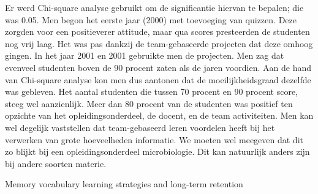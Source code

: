 \documentclass{hogent-article}
\begin{document}
	Er werd Chi-square analyse gebruikt om de significantie hiervan te bepalen; die was 0.05.
	Men begon het eerste jaar (2000) met toevoeging van quizzen. Deze zorgden voor een positieverer attitude, maar qua scores presteerden de studenten nog vrij laag. Het was pas dankzij de team-gebaseerde projecten dat deze omhoog gingen.
	In het jaar 2001 en 2001 gebruikte men de projecten. Men zag dat evenveel studenten boven de 90 procent zaten als de jaren voordien. Aan de hand van Chi-square analyse kon men dus aantonen dat de moeilijkheidsgraad dezelfde was gebleven. Het aantal studenten die tussen 70 procent en 90 procent score, steeg wel aanzienlijk. Meer dan 80 procent van de studenten was positief ten opzichte van het opleidingsonderdeel, de docent, en de team activiteiten.
	Men kan wel degelijk vaststellen dat team-gebaseerd leren voordelen heeft bij het verwerken van grote hoeveelheden informatie. We moeten wel meegeven dat dit zo blijkt bij een opleidingsonderdeel microbiologie. Dit kan natuurlijk anders zijn bij andere soorten materie.
	
	Memory vocabulary learning strategies and long-term retention \autocite{Nemati2009}
	
\end{document}
